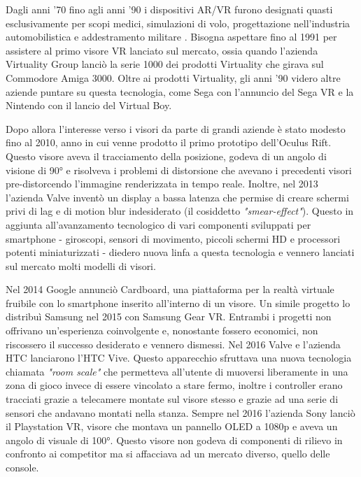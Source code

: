         Dagli anni '70 fino agli anni '90 i dispositivi AR/VR furono designati quasti esclusivamente per scopi medici, simulazioni di volo, progettazione nell'industria automobilistica e addestramento militare \cite{70and90VR}.
        Bisogna aspettare fino al 1991 per assistere al primo visore VR lanciato sul mercato, ossia quando l'azienda Virtuality Group lanciò la serie 1000 dei prodotti Virtuality che girava sul Commodore Amiga 3000.
        Oltre ai prodotti Virtuality, gli anni '90 videro altre aziende puntare su questa tecnologia, come Sega con l'annuncio del Sega VR e la Nintendo con il lancio del Virtual Boy.

        Dopo allora l'interesse verso i visori da parte di grandi aziende è stato modesto fino al 2010, anno in cui venne prodotto il primo prototipo dell'Oculus Rift.
        Questo visore aveva il tracciamento della posizione, godeva di un angolo di visione di 90° e risolveva i problemi di distorsione che avevano i precedenti visori pre-distorcendo l'immagine renderizzata in tempo reale.
        Inoltre, nel 2013 l'azienda Valve inventò un display a bassa latenza che permise di creare schermi privi di lag e di motion blur indesiderato (il cosiddetto \textit{"smear-effect"}).
        Questo in aggiunta all'avanzamento tecnologico di vari componenti sviluppati per smartphone - giroscopi, sensori di movimento, piccoli schermi HD e processori potenti miniaturizzati - diedero nuova linfa a questa tecnologia e vennero lanciati sul mercato molti modelli di visori.

        
        Nel 2014 Google annunciò Cardboard, una piattaforma per la realtà virtuale fruibile con lo smartphone inserito all'interno di un visore.
        Un simile progetto lo distribuì Samsung nel 2015 con Samsung Gear VR.
        Entrambi i progetti non offrivano un'esperienza coinvolgente e, nonostante fossero economici, non riscossero il successo desiderato e vennero dismessi. 
        Nel 2016 Valve e l'azienda HTC lanciarono l'HTC Vive.
        Questo apparecchio sfruttava una nuova tecnologia chiamata \textit{"room scale"} che permetteva all'utente di muoversi liberamente in una zona di gioco invece di essere vincolato a stare fermo, inoltre i controller erano tracciati grazie a telecamere montate sul visore stesso e grazie ad una serie di sensori che andavano montati nella stanza.
        Sempre nel 2016 l'azienda Sony lanciò il Playstation VR, visore che montava un pannello OLED a 1080p e aveva un angolo di visuale di 100°.
        Questo visore non godeva di componenti di rilievo in confronto ai competitor ma si affacciava ad un mercato diverso, quello delle console. 

